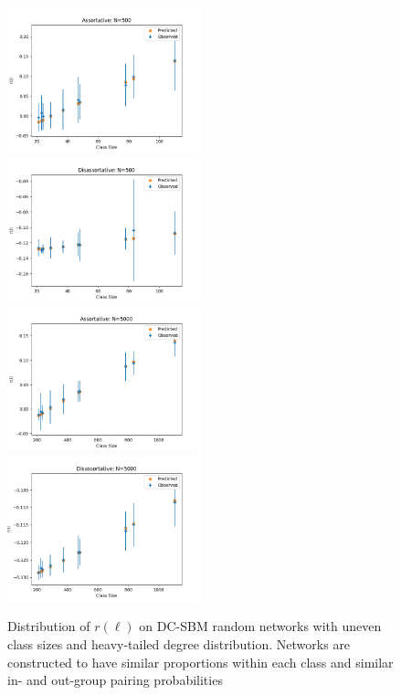 \documentclass[12pt]{article}
\begin{document}
\begin{figure}[h!]
\includegraphics[width=0.5\textwidth]{assortative_N_500.png}
\includegraphics[width=0.5\textwidth]{disassortative_N_500.png}
\includegraphics[width=0.5\textwidth]{assortative_N_5000.png}
\includegraphics[width=0.5\textwidth]{disassortative_N_5000.png}
\caption{Distribution of $r(\ell)$ on DC-SBM random networks with uneven class sizes and heavy-tailed degree distribution.  Networks are constructed to have similar proportions within each class and similar in- and out-group pairing probabilities}
\end{figure}
\end{document}
